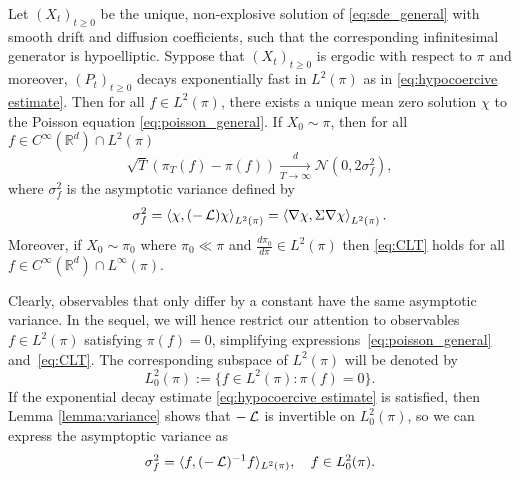\begin{lemma}
\label{lemma:variance}
Let $(X_t)_{t\geq 0}$ be the unique, non-explosive solution of \eqref{eq:sde_general}  with smooth drift and diffusion coefficients, such that the corresponding infinitesimal generator is hypoelliptic.  Syppose that $(X_t)_{t\ge0}$ is ergodic with respect to $\pi$ and moreover, $(P_t)_{t\ge0}$ decays exponentially fast in $L^2(\pi)$ as in \eqref{eq:hypocoercive estimate}.  Then for all $f\in L^2(\pi)$, there exists a unique mean zero solution $\chi$ to the Poisson equation \eqref{eq:poisson_general}.  If $X_0 \sim \pi$, then for all $f \in C^\infty(\mathbb{R}^d) \cap L^2(\pi)$
\begin{equation}
\label{eq:CLT}
  \sqrt{T}\left(\pi_T(f) - \pi(f)\right) \xrightarrow[T\rightarrow\infty]{d} \mathcal{N}(0, 2\sigma^2_f),
\end{equation}
where $\sigma^2_f$ is the asymptotic variance defined by
\begin{equation}
\label{eq:asymptoticvariance}
\sigma^2_{f} = \left\langle \chi, (-\operatorname{\mathcal{L}})\chi \right\rangle_{L^2(\pi)} = \left\langle \nabla \chi, \Sigma\nabla\chi \right\rangle_{L^2(\pi)}.
\end{equation}
Moreover, if $X_0 \sim \pi_0$ where $\pi_0 \ll \pi$ and $\frac{d\pi_0}{d\pi}\in L^2(\pi)$ then \eqref{eq:CLT} holds for all $f \in C^\infty(\mathbb{R}^d) \cap L^\infty(\pi)$.
\end{lemma}
%
Clearly, observables that only differ by a constant have the same asymptotic variance. 
In the	sequel, we will hence restrict our attention to observables $f\in L^{2}(\pi)$	satisfying $\pi(f)=0$, simplifying expressions~\eqref{eq:poisson_general}
	and~\eqref{eq:CLT}. The corresponding subspace of $L^2(\pi)$ will be denoted by 
\begin{equation}
L_{0}^2(\pi):=\{f \in L^2(\pi): \pi(f)=0\}.
\end{equation}
If the exponential decay estimate \eqref{eq:hypocoercive estimate} is satisfied, then Lemma \ref{lemma:variance} shows that $-\operatorname{\mathcal{L}}$ is invertible on $L^2_{0}(\pi)$, so we can express the asymptoptic variance as 
\begin{equation}
\label{eq:asym variance inverse}
\sigma_{f}^2=\langle f, (-\operatorname{\mathcal{L}})^{-1} f \rangle_{L^2(\pi)}, \quad f \in L^2_{0}(\pi).
\end{equation}
